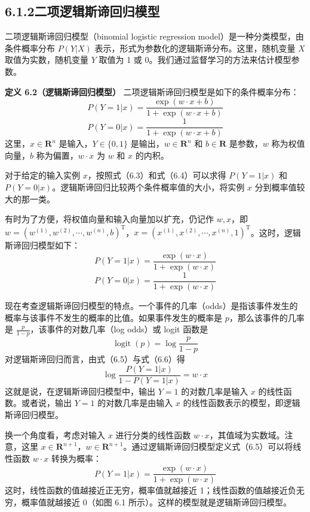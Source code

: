 \documentclass[UTF8, 12pt, fontset=fandol, oneside]{ctexart}
\begin{document}
\subsection*{6.1.2\quad 二项逻辑斯谛回归模型}

二项逻辑斯谛回归模型（binomial logistic regression model）是一种分类模型，由条件概率分布 $P(Y|X)$ 表示，形式为参数化的逻辑斯谛分布。这里，随机变量 $X$ 取值为实数，随机变量 $Y$ 取值为 1 或 0。我们通过监督学习的方法来估计模型参数。

\noindent\textbf{定义 6.2（逻辑斯谛回归模型）}\quad
二项逻辑斯谛回归模型是如下的条件概率分布：
\begin{equation}
P(Y=1|x)=\frac{\exp(w\cdot x+b)}{1+\exp(w\cdot x+b)}
\tag{6.3}
\end{equation}
\begin{equation}
P(Y=0|x)=\frac{1}{1+\exp(w\cdot x+b)}
\tag{6.4}
\end{equation}
这里，$x\in\mathbf{R}^n$ 是输入，$Y\in\{0,1\}$ 是输出，$w\in\mathbf{R}^n$ 和 $b\in\mathbf{R}$ 是参数，$w$ 称为权值向量，$b$ 称为偏置，$w\cdot x$ 为 $w$ 和 $x$ 的内积。

对于给定的输入实例 $x$，按照式（6.3）和式（6.4）可以求得 $P(Y=1|x)$ 和 $P(Y=0|x)$。逻辑斯谛回归比较两个条件概率值的大小，将实例 $x$ 分到概率值较大的那一类。

有时为了方便，将权值向量和输入向量加以扩充，仍记作 $w,x$，即 $w=(w^{(1)},w^{(2)},\cdots,w^{(n)},b)^{\mathrm{T}}$，$x=(x^{(1)},x^{(2)},\cdots,x^{(n)},1)^{\mathrm{T}}$。这时，逻辑斯谛回归模型如下：
\begin{equation}
P(Y=1|x)=\frac{\exp(w\cdot x)}{1+\exp(w\cdot x)}
\tag{6.5}
\end{equation}
\begin{equation}
P(Y=0|x)=\frac{1}{1+\exp(w\cdot x)}
\tag{6.6}
\end{equation}

现在考查逻辑斯谛回归模型的特点。一个事件的几率（odds）是指该事件发生的概率与该事件不发生的概率的比值。如果事件发生的概率是 $p$，那么该事件的几率是 $\frac{p}{1-p}$，该事件的对数几率（log odds）或 logit 函数是
\[
\operatorname{logit}(p)=\log\frac{p}{1-p}
\]
对逻辑斯谛回归而言，由式（6.5）与式（6.6）得
\[
\log\frac{P(Y=1|x)}{1-P(Y=1|x)}=w\cdot x
\]
这就是说，在逻辑斯谛回归模型中，输出 $Y=1$ 的对数几率是输入 $x$ 的线性函数。或者说，输出 $Y=1$ 的对数几率是由输入 $x$ 的线性函数表示的模型，即逻辑斯谛回归模型。

换一个角度看，考虑对输入 $x$ 进行分类的线性函数 $w\cdot x$，其值域为实数域。注意，这里 $x\in\mathbf{R}^{n+1}$，$w\in\mathbf{R}^{n+1}$。通过逻辑斯谛回归模型定义式（6.5）可以将线性函数 $w\cdot x$ 转换为概率：
\[
P(Y=1|x)=\frac{\exp(w\cdot x)}{1+\exp(w\cdot x)}
\]
这时，线性函数的值越接近正无穷，概率值就越接近 1；线性函数的值越接近负无穷，概率值就越接近 0（如图 6.1 所示）。这样的模型就是逻辑斯谛回归模型。
\end{document}
